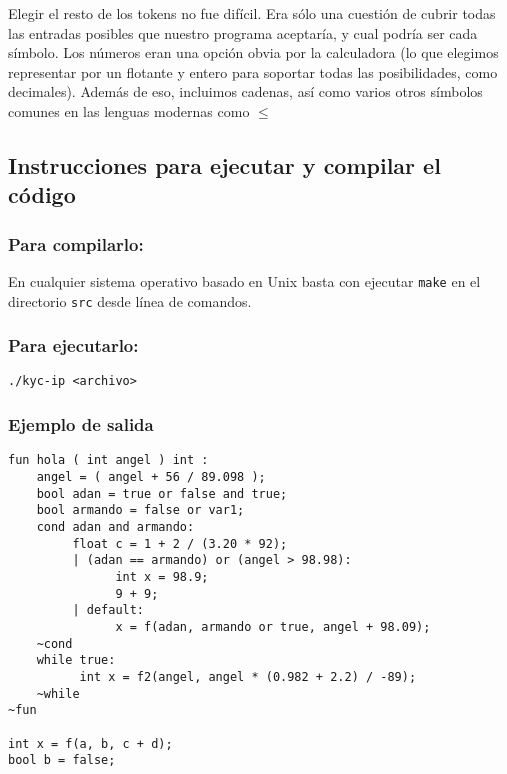 \documentclass[12pt]{article}
\begin{document}
Elegir el resto de los tokens no fue difícil. Era sólo una cuestión de cubrir todas las entradas posibles que nuestro programa aceptaría, y cual podría ser cada símbolo. Los números eran una opción obvia por la calculadora (lo que elegimos representar por un flotante y entero para soportar todas las posibilidades, como decimales). Además de eso, incluimos cadenas, así como varios otros símbolos comunes en las lenguas modernas como $\leq$

\subsection*{Instrucciones para ejecutar y compilar el código}

\subsubsection*{Para compilarlo:}

En cualquier sistema operativo basado en Unix basta con ejecutar \texttt{make} en el directorio \texttt{src} desde línea de comandos. 

\subsubsection*{Para ejecutarlo:} 

\texttt{./kyc-ip <archivo>}
\subsubsection*{Ejemplo de salida}
\begin{verbatim}
fun hola ( int angel ) int : 
    angel = ( angel + 56 / 89.098 );
    bool adan = true or false and true;
    bool armando = false or var1;
    cond adan and armando:
         float c = 1 + 2 / (3.20 * 92);
         | (adan == armando) or (angel > 98.98):
               int x = 98.9;
               9 + 9;
         | default:
               x = f(adan, armando or true, angel + 98.09);            
    ~cond
    while true:
          int x = f2(angel, angel * (0.982 + 2.2) / -89);            
    ~while
~fun

int x = f(a, b, c + d);
bool b = false;
\end{verbatim}
\end{document}
